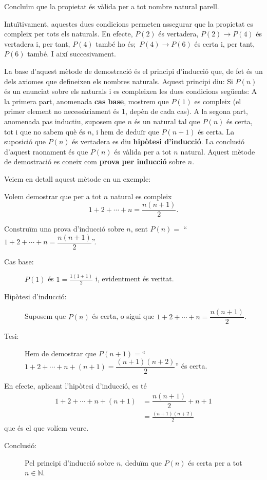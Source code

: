 Concluïm que la propietat és vàlida per a tot nombre natural
parell.

Intuïtivament, aquestes dues condicions permeten assegurar que la
propietat es compleix per tots els naturals. En efecte, $P(2)$ és
vertadera, $P(2)\longrightarrow P(4)$ és vertadera i, per tant, $P(4)$
també ho és;\ $P(4)\longrightarrow P(6)$ és certa i, per tant, $P(6)$ també. I així succesivament.

\bigskip

La base d'aquest mètode de demostració és el principi d'inducció que, de fet és un dels axiomes que defineixen els nombres
naturals. Aquest principi diu: Si $P(n)$ és un enunciat sobre els
naturals i es compleixen les dues condicions següents: A la primera
part, anomenada \textbf{cas base}, mostrem que $P(1)$ es compleix (el
primer element no necessàriament és 1, depèn de cada cas). A la
segona part, anomenada pas inductiu, suposem que $n$ és un natural tal
que $P(n)$ és certa, tot i que no sabem què és $n$, i hem de deduïr que $P(n+1)$ és certa. La suposició que $P(n)$ és
vertadera es diu \textbf{hipòtesi d'inducció}. La conclusió
d'aquest raonament és que $P(n)$ és vàlida per a tot $n$
natural. Aquest mètode de demostració es coneix com \textbf{prova
per inducció} sobre $n$.

\bigskip

Veiem en detall aquest mètode en un exemple:

\begin{exemple}
Volem demostrar que per a tot $n$ natural es compleix\begin{equation*}
1+2+\cdots+n=\frac{n(n+1)}{2}\text{.}
\end{equation*}
\end{exemple}

\begin{solucio}
Construïm una prova d'inducció sobre $n$, sent $P(n)=$ \enquote{$1+2+\cdots
+n=\dfrac{n(n+1)}{2}$}.

\begin{description}
\item[Cas base:] $P(1)$ és $1=\frac{1(1+1)}{2}$ i, evidentment és
veritat.

\item[Hipòtesi d'inducció:] Suposem que $P(n)$ és certa, o sigui
que $1+2+\cdots+n=\dfrac{n(n+1)}{2}$.

\item[Tesi:] Hem de demostrar que $P(n+1)=$\enquote{$1+2+\cdots+n+(n+1)=\dfrac{(n+1)(n+2)}{2}$} és certa.
\end{description}

En efecte, aplicant l'hipòtesi d'inducció, es té\begin{align*}
1+2+\cdots+n+(n+1) & =\dfrac{n(n+1)}{2}+n+1 \\
& =\frac{\left( n+1\right) (n+2)}{2}
\end{align*}
que és el que volíem veure.

\begin{description}
\item[Conclusió:] Pel principi d'inducció sobre $n$, deduïm que
$P(n)$ és certa per a tot $n\in\mathbb{N}$.
\end{description}
\end{solucio}

